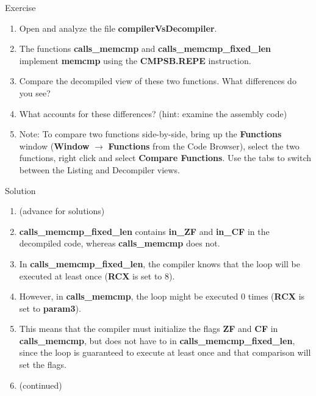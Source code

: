 \documentclass{beamer}
\begin{document}
\begin{frame}
\begin{block}{Exercise}
\begin{enumerate}
\item Open and analyze the file \textbf{compilerVsDecompiler}.
\item The functions \textbf{calls\_memcmp} and \textbf{calls\_memcmp\_fixed\_len} implement \textbf{memcmp} using the \textbf{CMPSB.REPE} instruction.
\item Compare the decompiled view of these two functions.  What differences do you see?
\item What accounts for these differences? (hint: examine the assembly code)
\item Note: To compare two functions side-by-side, bring up the \textbf{Functions} window (\textbf{Window} $\rightarrow$ \textbf{Functions} from the Code Browser), select
the two functions, right click and select \textbf{Compare Functions}.  Use the tabs to switch between the Listing and Decompiler views.
\end{enumerate}
\end{block}
\end{frame}

\begin{frame}
\begin{block}{Solution}
\begin{enumerate}
\item[] (advance for solutions)
\pause 
\item \textbf{calls\_memcmp\_fixed\_len} contains \textbf{in\_ZF} and \textbf{in\_CF} in the decompiled code, whereas \textbf{calls\_memcmp} does not.
\item In \textbf{calls\_memcmp\_fixed\_len}, the compiler knows that the loop will be executed at least once (\textbf{RCX} is set to 8).
\item However, in \textbf{calls\_memcmp}, the loop might be executed 0 times (\textbf{RCX} is set to \textbf{param3}).
\item This means that the compiler must initialize the flags \textbf{ZF} and \textbf{CF} in \textbf{calls\_memcmp}, but does not have to in \textbf{calls\_memcmp\_fixed\_len}, since
the loop is guaranteed to execute at least once and that comparison will set the flags. 
\item[] (continued)
\end{enumerate}
\end{block}
\end{frame}
\end{document}
